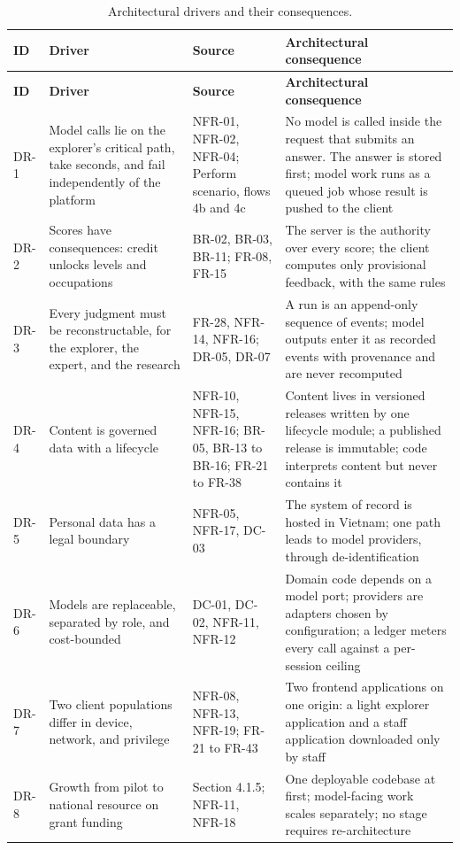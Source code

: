 {\small
\begin{longtable}{|>{\raggedright\arraybackslash}p{}|>{\raggedright\arraybackslash}p{}|>{\raggedright\arraybackslash}p{}|>{\raggedright\arraybackslash}p{}|}
\caption{Architectural drivers and their consequences.} \\
\hline
\textbf{ID} & \textbf{Driver} & \textbf{Source} & \textbf{Architectural consequence} \\ \hline
\endfirsthead
\hline
\textbf{ID} & \textbf{Driver} & \textbf{Source} & \textbf{Architectural consequence} \\ \hline
\endhead
DR-1 & Model calls lie on the explorer's critical path, take seconds, and fail independently of the platform & NFR-01, NFR-02, NFR-04; Perform scenario, flows 4b and 4c & No model is called inside the request that submits an answer. The answer is stored first; model work runs as a queued job whose result is pushed to the client \\ \hline
DR-2 & Scores have consequences: credit unlocks levels and occupations & BR-02, BR-03, BR-11; FR-08, FR-15 & The server is the authority over every score; the client computes only provisional feedback, with the same rules \\ \hline
DR-3 & Every judgment must be reconstructable, for the explorer, the expert, and the research & FR-28, NFR-14, NFR-16; DR-05, DR-07 & A run is an append-only sequence of events; model outputs enter it as recorded events with provenance and are never recomputed \\ \hline
DR-4 & Content is governed data with a lifecycle & NFR-10, NFR-15, NFR-16; BR-05, BR-13 to BR-16; FR-21 to FR-38 & Content lives in versioned releases written by one lifecycle module; a published release is immutable; code interprets content but never contains it \\ \hline
DR-5 & Personal data has a legal boundary & NFR-05, NFR-17, DC-03 & The system of record is hosted in Vietnam; one path leads to model providers, through de-identification \\ \hline
DR-6 & Models are replaceable, separated by role, and cost-bounded & DC-01, DC-02, NFR-11, NFR-12 & Domain code depends on a model port; providers are adapters chosen by configuration; a ledger meters every call against a per-session ceiling \\ \hline
DR-7 & Two client populations differ in device, network, and privilege & NFR-08, NFR-13, NFR-19; FR-21 to FR-43 & Two frontend applications on one origin: a light explorer application and a staff application downloaded only by staff \\ \hline
DR-8 & Growth from pilot to national resource on grant funding & Section 4.1.5; NFR-11, NFR-18 & One deployable codebase at first; model-facing work scales separately; no stage requires re-architecture \\ \hline
\end{longtable}
}

